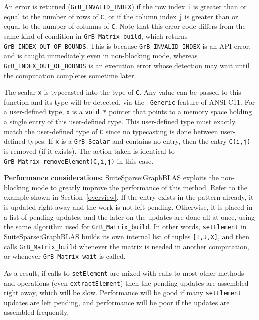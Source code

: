 \documentclass[12pt]{article}
\begin{document}
{An error is returned (\verb'GrB_INVALID_INDEX') if the row index \verb'i' is
greater than or equal to the number of rows of \verb'C', or if the column index
\verb'j' is greater than or equal to the number of columns of \verb'C'.  Note
that this error code differs from the same kind of condition in
\verb'GrB_Matrix_build', which returns \verb'GrB_INDEX_OUT_OF_BOUNDS'.  This is
because \verb'GrB_INVALID_INDEX' is an API error, and is caught immediately
even in non-blocking mode, whereas \verb'GrB_INDEX_OUT_OF_BOUNDS' is an
execution error whose detection may wait until the computation completes
sometime later.

The scalar \verb'x' is typecasted into the type of \verb'C'.  Any value can be
passed to this function and its type will be detected, via the \verb'_Generic'
feature of ANSI C11.  For a user-defined type, \verb'x' is a \verb'void *'
pointer that points to a memory space holding a single entry of this
user-defined type.  This user-defined type must exactly match the user-defined
type of \verb'C' since no typecasting is done between user-defined types.
%
If \verb'x' is a \verb'GrB_Scalar' and contains no entry, then the
entry \verb'C(i,j)' is removed (if it exists).  The action taken is
identical to \verb'GrB_Matrix_removeElement(C,i,j)' in this case.

{\bf Performance considerations:} %
SuiteSparse:GraphBLAS exploits the non-blocking mode to greatly improve the
performance of this method.  Refer to the example shown in
Section~\ref{overview}.  If the entry exists in the pattern already, it is
updated right away and the work is not left pending.  Otherwise, it is placed
in a list of pending updates, and the later on the updates are done all at
once, using the same algorithm used for \verb'GrB_Matrix_build'.  In other
words, \verb'setElement' in SuiteSparse:GraphBLAS builds its own internal list
of tuples \verb'[I,J,X]', and then calls \verb'GrB_Matrix_build' whenever the
matrix is needed in another computation, or whenever \verb'GrB_Matrix_wait' is
called.

As a result, if calls to \verb'setElement' are mixed with calls to most other
methods and operations (even \verb'extractElement') then the pending updates
are assembled right away, which will be slow.  Performance will be good if many
\verb'setElement' updates are left pending, and performance will be poor if the
updates are assembled frequently.

}
\end{document}
